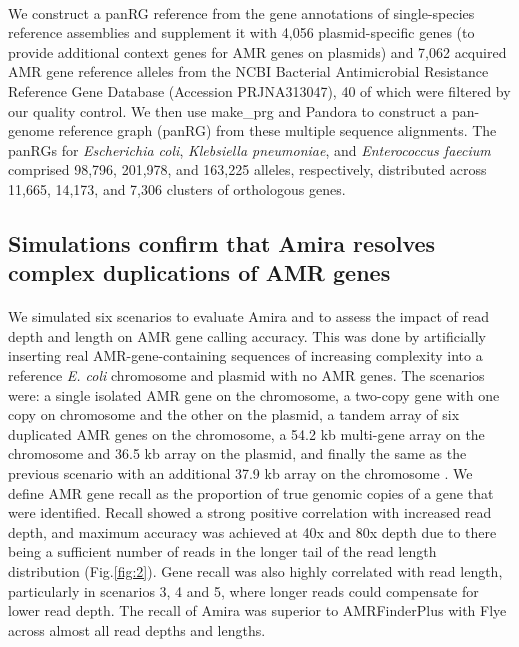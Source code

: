 \paragraph{}
We construct a panRG reference from the gene annotations of single-species reference assemblies and supplement it with 4,056 plasmid-specific genes \cite{10.1099/mgen.0.000206} (to provide additional context genes for AMR genes on plasmids) and 7,062 acquired AMR gene reference alleles from the NCBI Bacterial Antimicrobial Resistance Reference Gene Database (Accession PRJNA313047), 40 of which were filtered by our quality control. We then use make\_prg and Pandora to construct a pan-genome reference graph (panRG) from these multiple sequence alignments. The panRGs for \textit{Escherichia coli}, \textit{Klebsiella pneumoniae}, and \textit{Enterococcus faecium} comprised 98,796, 201,978, and 163,225 alleles, respectively, distributed across 11,665, 14,173, and 7,306 clusters of orthologous genes.

\subsection*{Simulations confirm that Amira resolves complex duplications of AMR genes}
\paragraph{}
We simulated six scenarios to evaluate Amira and to assess the impact of read depth and length on AMR gene calling accuracy. This was done by artificially inserting real AMR-gene-containing sequences of increasing complexity into a reference \textit{E. coli} chromosome and plasmid with no AMR genes. The scenarios were: a single isolated AMR gene on the chromosome, a two-copy gene with one copy on chromosome and the other on the plasmid, a tandem array of six duplicated AMR genes on the chromosome, a 54.2 kb multi-gene array on the chromosome and 36.5 kb array on the plasmid, and finally the same as the previous scenario with an additional 37.9 kb array on the chromosome \cite{TamamuraAndoh2021}. We define AMR gene recall as the proportion of true genomic copies of a gene that were identified. Recall showed a strong positive correlation with increased read depth, and maximum accuracy was achieved at 40x and 80x depth due to there being a sufficient number of reads in the longer tail of the read length distribution (Fig.\ref{fig:2}). Gene recall was also highly correlated with read length, particularly in scenarios 3, 4 and 5, where longer reads could compensate for lower read depth. The recall of Amira was superior to AMRFinderPlus with Flye across almost all read depths and lengths.
